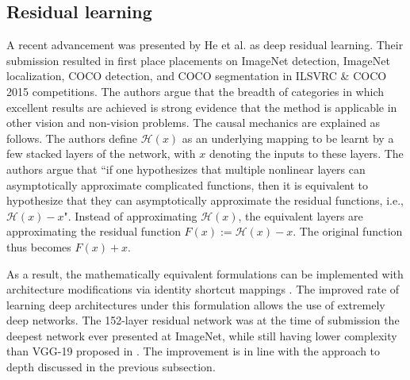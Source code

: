 \documentclass[12pt]{llncs}
\begin{document}
\subsection{Residual learning}
A recent advancement was presented by He et al. \cite{he2016deep} as deep residual learning. Their submission resulted in first place placements on ImageNet detection, ImageNet localization, COCO detection, and COCO segmentation in ILSVRC \&
COCO 2015 competitions. The authors argue that the breadth of categories in which excellent results are achieved is strong evidence that the method is applicable in other vision and non-vision problems. 
The causal mechanics are explained as follows. The authors define $\mathcal{H}(x)$ as an underlying mapping to be learnt by a few stacked layers of the network, with $x$ denoting the inputs to these layers. The authors argue that ``if one hypothesizes that multiple nonlinear layers can asymptotically approximate complicated functions, then it is equivalent to hypothesize that they can asymptotically approximate the residual functions, i.e., $\mathcal{H}(x) - x$". Instead of approximating $\mathcal{H}(x)$, the equivalent layers are approximating the residual function $F(x) := \mathcal{H}(x) - x$. The original function thus becomes $F(x)+x$. 

As a result, the mathematically equivalent formulations can be implemented with architecture modifications via identity shortcut mappings \cite[Figure 3]{he2016deep}. The improved rate of learning deep architectures under this formulation allows the use of extremely deep networks. The 152-layer residual network was at the time of submission the deepest network ever presented at ImageNet, while still having lower complexity than VGG-19 proposed in \cite{simonyan2014very}. The improvement is in line with the approach to depth discussed in the previous subsection.
\end{document}
